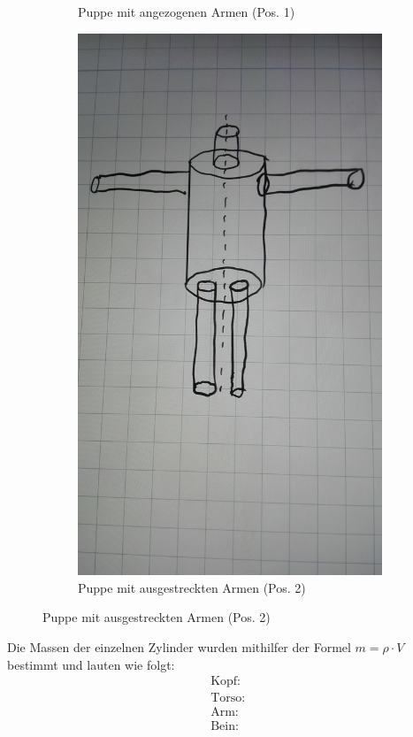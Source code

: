 \begin{figure}[H]
\begin{subfigure}{0.495\linewidth}
\caption{Puppe mit angezogenen Armen (Pos. 1)}
\end{subfigure}
\begin{subfigure}{0.495\linewidth}
\centering
\includegraphics[width=\textwidth]{images/puppe_aus.jpg}
\caption{Puppe mit ausgestreckten Armen (Pos. 2)}
\end{subfigure}
\end{figure}

Die Massen der einzelnen Zylinder wurden mithilfer der Formel $m= \rho \cdot V$ bestimmt und lauten wie folgt:
\begin{subequations}
\begin{align}
\text{Kopf: }\label{eq:Kopf}\\
\text{Torso: }\label{eq:Torso}\\
\text{Arm: }\label{eq:Arm}\\
\text{Bein: }\label{eq:Bein}
\end{align}
\end{subequations}

